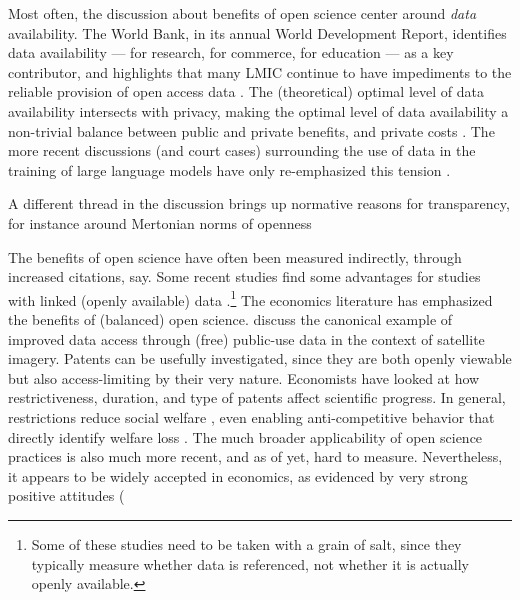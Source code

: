 \documentclass{article}
\begin{document}
Most often, the discussion about benefits of open science center around \textit{data} availability. The World Bank, in its annual World Development Report, identifies data availability --- for research, for commerce, for education --- as a key contributor, and highlights that many LMIC continue to have impediments to the reliable provision of open access data \citep[, pg. 62]{world_bank_world_2021}. The (theoretical) optimal level of data availability intersects with privacy, making the optimal level of data availability a non-trivial balance between public and private benefits, and private costs \citep{duch-brown_economics_2017,acquisti_economics_2016,abowd_suboptimal_2019,abowd_economic_2018}. The more recent discussions (and court cases) surrounding the use of data in the training of large language models have only re-emphasized this tension \citep{panettieri_generative_2025}.

A different thread in the discussion brings up normative reasons for transparency, for instance around Mertonian \citep{merton1942note} norms of openness 

The  benefits of open science have often been measured indirectly, through increased citations, say. Some recent studies find some advantages for studies with linked (openly available) data \citep{piwowar_data_2013,colavizza_citation_2020,christensen_study_2019}.\footnote{Some of these studies need to be taken with a grain of salt, since they typically measure whether data is referenced, not whether it is actually openly available.} The economics literature has emphasized the benefits of (balanced) open science. \citet{nagaraj_improving_2020} discuss the canonical example of improved data access through (free) public-use data in the context of satellite imagery. Patents can be usefully investigated, since they are both openly viewable but also access-limiting by their very nature. Economists have looked at how restrictiveness, duration, and type of patents affect scientific progress. In general, restrictions reduce social welfare \citep{williams_intellectual_2013,murray_mice_2016}, even enabling anti-competitive behavior that directly identify welfare loss \citep{xie_anticompetitive_2020}. The much broader applicability of open science practices is also much more recent, and as of yet, hard to measure. Nevertheless, it appears to be widely accepted in economics, as evidenced by very strong positive attitudes (
\end{document}
